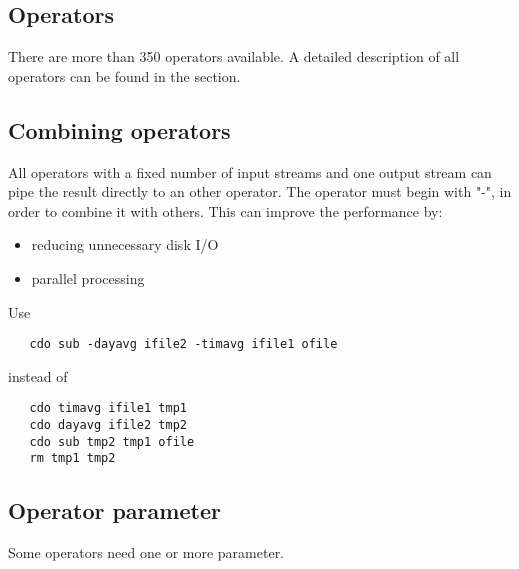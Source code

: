\subsection{Operators}

There are more than 350 operators available.
A detailed description of all operators can be found in the
{\bf {}} section.


\subsection{Combining operators}

All operators with a fixed number of input streams and one output stream
can pipe the result directly to an other operator.
The operator must begin with "-", in order to combine it with others.
This can improve the performance by:
\begin{itemize}
\item reducing unnecessary disk I/O
\item parallel processing
\end{itemize}
Use
\begin{verbatim}
   cdo sub -dayavg ifile2 -timavg ifile1 ofile
\end{verbatim}
instead of
\begin{verbatim}
   cdo timavg ifile1 tmp1
   cdo dayavg ifile2 tmp2
   cdo sub tmp2 tmp1 ofile
   rm tmp1 tmp2
\end{verbatim}


\subsection{Operator parameter}

Some operators need one or more parameter.

